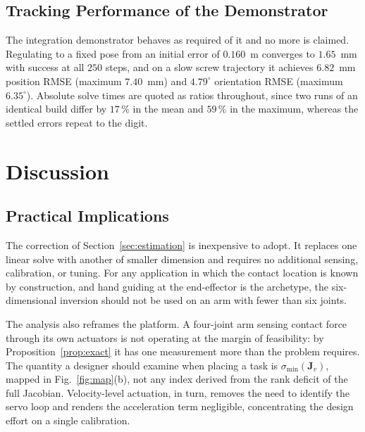 \documentclass{ieeeaccess}
\newcommand{\Jv}{\bm{J}_{\!v}}
\begin{document}
\subsection{Tracking Performance of the Demonstrator}
The integration demonstrator behaves as required of it and no more is claimed.
Regulating to a fixed pose from an initial error of $0.160$~m converges to
$1.65$~mm with success at all $250$ steps, and on a slow screw trajectory it
achieves $6.82$~mm position RMSE (maximum $7.40$~mm) and $4.79^\circ$ orientation
RMSE (maximum $6.35^\circ$). Absolute solve times are quoted as ratios throughout,
since two runs of an identical build differ by $17\,\%$ in the mean and $59\,\%$
in the maximum, whereas the settled errors repeat to the digit.

\section{Discussion}
\label{sec:discussion}

\subsection{Practical Implications}
The correction of Section~\ref{sec:estimation} is inexpensive to adopt. It
replaces one linear solve with another of smaller dimension and requires no
additional sensing, calibration, or tuning. For any application in which the
contact location is known by construction, and hand guiding at the end-effector is
the archetype, the six-dimensional inversion should not be used on an arm with
fewer than six joints.

The analysis also reframes the platform. A four-joint arm sensing contact force
through its own actuators is not operating at the margin of feasibility: by
Proposition~\ref{prop:exact} it has one measurement more than the problem
requires. The quantity a designer should examine when placing a task is
$\sigma_{\min}(\Jv)$, mapped in Fig.~\ref{fig:map}(b), not any index derived from
the rank deficit of the full Jacobian. Velocity-level actuation, in turn, removes
the need to identify the servo loop and renders the acceleration term negligible,
concentrating the design effort on a single calibration.
\end{document}
